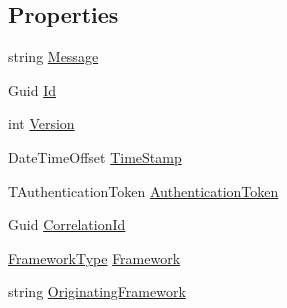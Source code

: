 \subsection*{Properties}
\begin{DoxyCompactItemize}
\item 
string \hyperlink{classCqrs_1_1EventStore_1_1SimpleEvent_a4e07144de1cdb94bbbf1313eb0e1f35d_a4e07144de1cdb94bbbf1313eb0e1f35d}{Message}
\item 
Guid \hyperlink{classCqrs_1_1EventStore_1_1SimpleEvent_a7baf42c52ddbd269ae3739ddd7a777a4_a7baf42c52ddbd269ae3739ddd7a777a4}{Id}
\item 
int \hyperlink{classCqrs_1_1EventStore_1_1SimpleEvent_a9c67d7a71f357201db7801cd9122415e_a9c67d7a71f357201db7801cd9122415e}{Version}
\item 
Date\+Time\+Offset \hyperlink{classCqrs_1_1EventStore_1_1SimpleEvent_a47ab7f023f640dbfe6a1f1395a94b147_a47ab7f023f640dbfe6a1f1395a94b147}{Time\+Stamp}
\item 
T\+Authentication\+Token \hyperlink{classCqrs_1_1EventStore_1_1SimpleEvent_a91ca9d263c41a4b5ffc30f9245aa6fe9_a91ca9d263c41a4b5ffc30f9245aa6fe9}{Authentication\+Token}
\item 
Guid \hyperlink{classCqrs_1_1EventStore_1_1SimpleEvent_aa96b900b0fef8e6b2f6af81b5ce99f16_aa96b900b0fef8e6b2f6af81b5ce99f16}{Correlation\+Id}
\item 
\hyperlink{namespaceCqrs_1_1Messages_af06a7e6cd2609043d0f2f5f3419f81e3_af06a7e6cd2609043d0f2f5f3419f81e3}{Framework\+Type} \hyperlink{classCqrs_1_1EventStore_1_1SimpleEvent_aaf8a01038e32c3f0c0edd53fbad3658c_aaf8a01038e32c3f0c0edd53fbad3658c}{Framework}
\item 
string \hyperlink{classCqrs_1_1EventStore_1_1SimpleEvent_a3b365c5f9a7ee4491e01a463dca178b7_a3b365c5f9a7ee4491e01a463dca178b7}{Originating\+Framework}

\end{DoxyCompactItemize}
